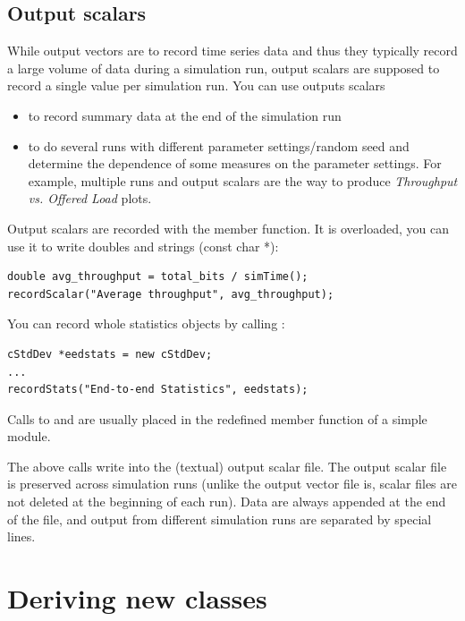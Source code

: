 \subsection{Output scalars}

While output vectors are to record time series data and thus they
typically record a large volume of data during a simulation run,
output scalars are supposed to record a single
value per simulation run. You can use outputs scalars
\begin{itemize}
\item{to record summary data at the end of the simulation run}
\item{to do several runs with different parameter settings/random seed
    and determine the dependence of some measures on the parameter
    settings. For example, multiple runs and output scalars are the
    way to produce \textit{Throughput vs. Offered Load} plots.}
\end{itemize}

Output scalars are recorded with the  member
function.  It is overloaded, you can use it to write doubles and
strings (const char *):

\begin{Verbatim}
double avg_throughput = total_bits / simTime();
recordScalar("Average throughput", avg_throughput);
\end{Verbatim}


You can record whole statistics objects by calling :

\begin{Verbatim}
cStdDev *eedstats = new cStdDev;
...
recordStats("End-to-end Statistics", eedstats);
\end{Verbatim}



Calls to  and  are usually
placed in the redefined  member function of a
simple module.


The above calls write into the (textual) output scalar file.  The
output scalar file is preserved across simulation runs (unlike the
output vector file is, scalar files are not deleted at the beginning
of each run). Data are always appended at the end of the file, and
output from different simulation runs are separated by special lines.





\section{Deriving new classes}

